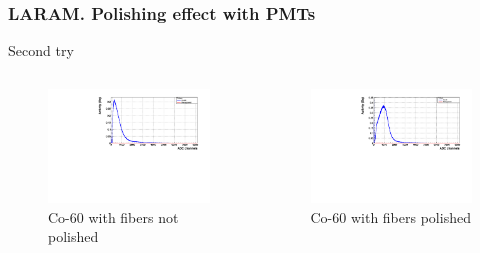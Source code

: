 \documentclass{beamer}
\begin{document}
\begin{frame}
\frametitle{LARAM. Polishing effect with PMTs}
Second try\\

\begin{columns}

\begin{figure}[hbtp]
\centering
\includegraphics[scale=0.3]{LARAM/Polishing_effect/Second_try/No_polished/Co_60_no_polished.pdf}
\caption{Co-60 with fibers not polished}
\end{figure}


\begin{figure}[hbtp]
\centering
\includegraphics[scale=0.3]{LARAM/Polishing_effect/Second_try/Polished/Co_60_polished.pdf}
\caption{Co-60 with fibers polished}
\end{figure}

\end{columns}

\end{frame}
\end{document}
